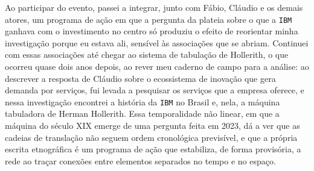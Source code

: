Ao participar do evento, passei a integrar, junto com Fábio, Cláudio e os demais atores, um programa de ação em que a pergunta da plateia sobre o que a \texttt{IBM} ganhava com o investimento no centro só produziu o efeito de reorientar minha investigação porque eu estava ali, sensível às associações que se abriam. Continuei com essas associações até chegar ao sistema de tabulação de Hollerith, o que ocorreu quase dois anos depois, ao rever meu caderno de campo para a análise: ao descrever a resposta de Cláudio sobre o ecossistema de inovação que gera demanda por serviços, fui levada a pesquisar os serviços que a empresa oferece, e nessa investigação encontrei a história da \texttt{IBM} no Brasil e, nela, a máquina tabuladora de Herman Hollerith. Essa temporalidade não linear, em que a máquina do século XIX emerge de uma pergunta feita em 2023, dá a ver que as cadeias de translação não seguem ordem cronológica previsível, e que a própria escrita etnográfica é um programa de ação que estabiliza, de forma provisória, a rede ao traçar conexões entre elementos separados no tempo e no espaço.

